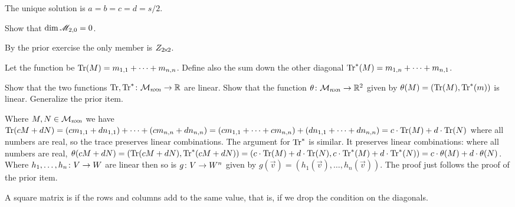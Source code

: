\begin{exercises}
\begin{answer}
\begin{equation*}
      \end{equation*}
      The unique solution is $a=b=c=d=s/2$.
    \end{answer}
  \item \label{exer:DimTwoMagicSqsMagicSumZero} 
    Show that $\dim\mathscr{M}_{2,0}=0$.
    \begin{answer}
       By the prior exercise the only member is $Z_{2 \! \times \! 2}$.
    \end{answer}
  \item   \label{exer:TraceIsLinear}
    Let the  function be 
    $\operatorname{Tr} (M)=m_{1,1}+\cdots+m_{n,n}$.
    Define also
    the sum down the other diagonal
    $\operatorname{Tr}^* (M)=m_{1,n}+\cdots+m_{n,1}$.
    \begin{exparts}
      \partsitem 
        Show that the two functions 
        $\mbox{$\operatorname{Tr},\operatorname{Tr}^*\colon \mathcal{M}_{n \! \times \! n}\to \mathbb{R}$}$
        are linear.
      \partsitem
        Show that the function
       $\mbox{$\theta\colon \mathcal{M}_{n \! \times \! n}\to \mathbb{R}^2$}$
       given by $\theta(M)=(\operatorname{Tr}(M),\operatorname{Tr}^*(m))$
       is linear.
     \partsitem
       Generalize the prior item. 
    \end{exparts}
    \begin{answer}
      \begin{exparts}
        \partsitem
          Where $M,N\in\mathcal{M}_{n \! \times \! n}$ we have 
          $\operatorname{Tr}(cM+dN)=(cm_{1,1}+dn_{1,1})+\cdots+(cm_{n,n}+dn_{n,n})
          =(cm_{1,1}+\cdots+cm_{n,n})+(dn_{1,1}+\cdots+dn_{n,n})
          =c\cdot\operatorname{Tr}(M)+d\cdot\operatorname{Tr}(N)$ where
          all numbers are real, so the trace preserves linear
         combinations.
         The argument for $\operatorname{Tr}^*$ is similar.
       \partsitem
         It preserves linear combinations: where all numbers are real,
          $\theta(cM+dN)=(\operatorname{Tr}(cM+dN),\operatorname{Tr}^*(cM+dN))
          =(c\cdot\operatorname{Tr}(M)+d\cdot\operatorname{Tr}(N), c\cdot\operatorname{Tr}^*(M)+d\cdot\operatorname{Tr}^*(N))
          =c\cdot\theta(M)+d\cdot\theta(N)$.
       \partsitem   
         Where $\mbox{$h_1,\ldots,h_n\colon V\to W$}$ are linear then so is
         $\mbox{$g\colon V\to W^n$}$ given by
         $g(\vec{v})=(h_1(\vec{v}), \ldots, h_n(\vec{v}))$.
         The proof just follows the proof of the prior item.
      \end{exparts}
    \end{answer}
  \item A square matrix is  if 
     the rows and columns add to the same value, that is, if we drop the
     condition on the diagonals.
     \begin{exparts*}

\end{exparts*}
\end{exercises}
